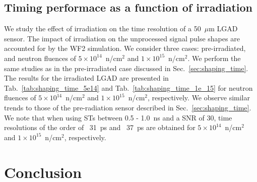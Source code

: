 \documentclass[preprint,1p]{elsarticle}
\begin{document}
\subsection{Timing performace as a function of irradiation}\label{sec:rad_tolerance}
We study the effect of irradiation on the time resolution of a 50~$\mu$m LGAD sensor. The impact of irradiation on the unprocessed
signal pulse shapes are accounted for by the WF2 simulation. We consider three cases: pre-irradiated, and neutron fluences of
$5\times 10^{14}$~n/cm$^2$ and $1\times 10^{15}$~n/cm$^2$. We perform the same studies as in the pre-irradiated case discussed in
Sec.~\ref{sec:shaping_time}. The results for the irradiated LGAD are presented in Tab.~\ref{tab:shaping_time_5e14} and
Tab.~\ref{tab:shaping_time_1e_15} for neutron fluences of
$5\times 10^{14}$~n/cm$^2$ and $1\times 10^{15}$~n/cm$^2$, respectively.
We observe similar trends to those of the pre-radiation sensor described in
Sec.~\ref{sec:shaping_time}. We note that when using STs between 0.5 - 1.0~\si{ns} and a SNR of 30, time resolutions of the order
of ~31~\si{ps} and ~37~\si{ps} are obtained for $5\times 10^{14}$~n/cm$^2$ and $1\times 10^{15}$~n/cm$^2$, respectively.

\section{Conclusion}\label{sec:conclusion}
\end{document}
